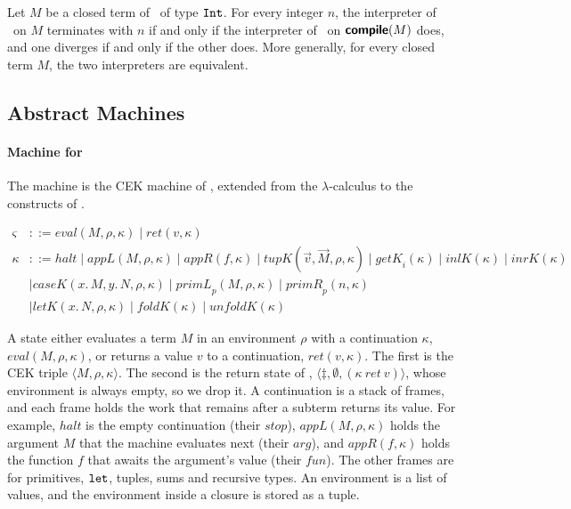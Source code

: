 \begin{proposition}\label{prop:interp}
Let $M$ be a closed term of \fpc\ of type $\mathtt{Int}$. For every integer $n$, the interpreter of \fpc\ on $M$ terminates with $n$ if and only if the interpreter of \instr\ on $\textsf{\bfseries compile}(M)$ does, and one diverges if and only if the other does. More generally, for every closed term $M$, the two interpreters are equivalent.
\end{proposition}

\subsection{Abstract Machines}
\label{app:machines}

\paragraph{Machine for \fpc}

The machine is the CEK machine of \citet{Felleisen:kx}, extended from
the $\lambda$-calculus to the constructs of \fpc.

\vspace{-5pt}
\begin{align*}
  \varsigma &::= \mathit{eval}(M, \rho, \kappa) \mid \mathit{ret}(v, \kappa) \\
  \kappa &::= \mathit{halt} \mid \mathit{appL}(M, \rho, \kappa) \mid \mathit{appR}(f, \kappa)
    \mid \mathit{tupK}(\vec{v}, \vec{M}, \rho, \kappa) \mid \mathit{getK}_i(\kappa)
    \mid \mathit{inlK}(\kappa) \mid \mathit{inrK}(\kappa) \\
 &\mid \mathit{caseK}(x.\,M, y.\,N, \rho, \kappa) \mid \mathit{primL}_p(M, \rho, \kappa)
    \mid \mathit{primR}_p(n, \kappa) \\
 &\mid \mathit{letK}(x.\,N, \rho, \kappa) \mid \mathit{foldK}(\kappa) \mid \mathit{unfoldK}(\kappa)
\end{align*}

A state either evaluates a term $M$ in an environment $\rho$ with a continuation
$\kappa$, $\mathit{eval}(M, \rho, \kappa)$, or returns a value $v$ to a
continuation, $\mathit{ret}(v, \kappa)$. The first is the CEK triple $\langle
M, \rho, \kappa\rangle$. The second is the return state of \citet{Felleisen:kx},
$\langle \ddagger, \emptyset, (\kappa\ \mathit{ret}\ v)\rangle$, whose
environment is always empty, so we drop it. A continuation is a stack of frames,
and each frame holds the work that remains after a subterm returns its value.
For example, $\mathit{halt}$ is the empty continuation (their $\mathit{stop}$),
$\mathit{appL}(M, \rho, \kappa)$ holds the argument $M$ that the machine
evaluates next (their $\mathit{arg}$), and $\mathit{appR}(f,
\kappa)$ holds the function $f$ that awaits the argument's value (their
$\mathit{fun}$). The other frames are for primitives, $\mathtt{let}$, tuples, sums
and recursive types. An environment is a list of values, and the environment
inside a closure is stored as a tuple.

